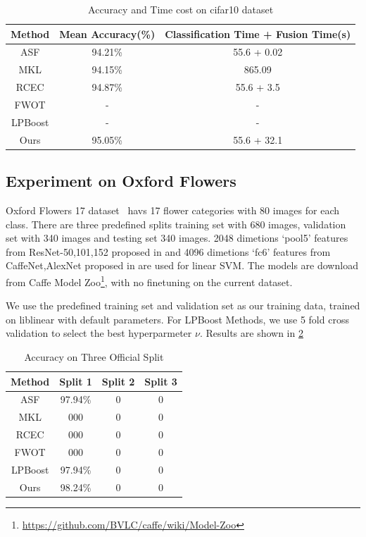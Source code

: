 \documentclass[letterpaper]{article}
\begin{document}
\begin{table}[h]\scriptsize
\centering
\label{table:cifar10}
\begin{tabular}{c|c|c}
\hline
Method & Mean Accuracy(\%) & Classification Time + Fusion Time(s)\\\hline
ASF &  94.21\% & 55.6 + 0.02 \\
MKL &  94.15\% & 865.09 \\
RCEC &  94.87\% & 55.6 + 3.5 \\
FWOT &  - & - \\
LPBoost & - & - \\\hline
Ours &  95.05\% & 55.6 + 32.1 \\
\hline
\end{tabular}
\caption{Accuracy and Time cost on cifar10 dataset}
\end{table}



\subsection{Experiment on Oxford Flowers}
Oxford Flowers 17 dataset~\cite{nilsback2006visual} havs 17 flower categories with 80 images for each class. There are three predefined splits training set with 680 images, validation set with 340 images and testing set 340 images. 2048 dimetions `pool5' features from ResNet-50,101,152 proposed in \cite{he2015deep} and 4096 dimetions `fc6' features from CaffeNet,AlexNet proposed in \cite{krizhevsky2012imagenet} are used for linear SVM. The models are download from Caffe Model Zoo\footnote{\url{https://github.com/BVLC/caffe/wiki/Model-Zoo}}, with no finetuning on the current dataset.

We use the predefined training set and validation set as our training data, trained on liblinear with default parameters. For LPBoost Methods, we use 5 fold cross validation to select the best hyperparmeter $\nu$. 
Results are shown in \ref{table:flower17}


\begin{table}[h]\scriptsize
\centering
\label{table:flower17}
\begin{tabular}{c|c|c|c}
\hline
Method & Split 1 & Split 2 & Split 3\\\hline
ASF &  97.94\% & 0 & 0 \\
MKL &  000 & 0 & 0 \\
RCEC &  000 & 0 & 0 \\
FWOT &  000 & 0 & 0 \\
LPBoost & 97.94\% & 0 & 0 \\\hline
Ours &  98.24\% & 0 & 0 \\
\hline
\end{tabular}
\caption{Accuracy on Three Official Split}
\end{table}

\begin{quote}
\begin{small}
  
  
\end{small}
\end{quote}
\end{document}
